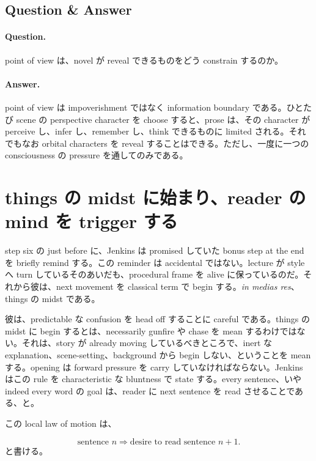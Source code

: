 \subsection{Question \& Answer}

\paragraph{Question.} point of view は、novel が reveal できるものをどう constrain するのか。

\paragraph{Answer.} point of view は impoverishment ではなく information boundary である。ひとたび scene の perspective character を choose すると、prose は、その character が perceive し、infer し、remember し、think できるものに limited される。それでもなお orbital characters を reveal することはできる。ただし、一度に一つの consciousness の pressure を通してのみである。

\section{things の midst に始まり、reader の mind を trigger する}

step six の just before に、Jenkins は promised していた bonus step at the end を briefly remind する。この reminder は accidental ではない。lecture が style へ turn しているそのあいだも、procedural frame を alive に保っているのだ。それから彼は、next movement を classical term で begin する。\emph{in medias res}、things の midst である。

彼は、predictable な confusion を head off することに careful である。things の midst に begin するとは、necessarily gunfire や chase を mean するわけではない。それは、story が already moving しているべきところで、inert な explanation、scene-setting、background から begin しない、ということを mean する。opening は forward pressure を carry していなければならない。Jenkins はこの rule を characteristic な bluntness で state する。every sentence、いや indeed every word の goal は、reader に next sentence を read させることである、と。

この local law of motion は、

\begin{equation}
\text{sentence } n \Rightarrow \text{desire to read sentence } n+1.
\end{equation}
と書ける。

